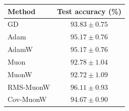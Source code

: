 \begin{tabular}{lc}
\toprule
Method & Test accuracy (\%) \\
\midrule
GD & $93.83 \pm 0.75$ \\
Adam & $95.17 \pm 0.76$ \\
AdamW & $95.17 \pm 0.76$ \\
Muon & $92.78 \pm 1.04$ \\
MuonW & $92.72 \pm 1.09$ \\
RMS-MuonW & $96.11 \pm 0.93$ \\
Cov-MuonW & $94.67 \pm 0.90$ \\
\bottomrule
\end{tabular}

